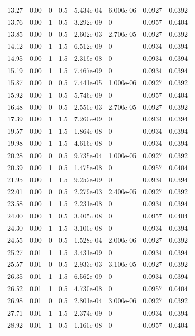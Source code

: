 \documentclass[preview]{standalone}
\begin{document}
{{\begin{tabular}{L{1.2cm}C{1.2cm} C{0.3cm}C{0.5cm} C{1.4cm}C{1.4cm} C{1.4cm}C{1.4cm}}
  13.27  &  0.00  & 0     & 0.5 &  5.434e-04  & 6.000e-06  & 0.0927 &  0.0392   \\ 
  13.76  &  0.00  & 1     & 0.5 &  3.292e-09  & 0  & 0.0957 &  0.0404   \\ 
  13.85  &  0.00  & 0     & 0.5 &  2.602e-03  & 2.700e-05  & 0.0927 &  0.0392   \\ 
  14.12  &  0.00  & 1     & 1.5 &  6.512e-09  & 0  & 0.0934 &  0.0394   \\ 
  14.95  &  0.00  & 1     & 1.5 &  2.319e-08  & 0  & 0.0934 &  0.0394   \\ 
  15.19  &  0.00  & 1     & 1.5 &  7.467e-09  & 0  & 0.0934 &  0.0394   \\ 
  15.87  &  0.00  & 0     & 0.5 &  7.441e-05  & 1.000e-06  & 0.0927 &  0.0392   \\ 
  15.92  &  0.00  & 1     & 0.5 &  5.746e-09  & 0  & 0.0957 &  0.0404   \\ 
  16.48  &  0.00  & 0     & 0.5 &  2.550e-03  & 2.700e-05  & 0.0927 &  0.0392   \\ 
  17.39  &  0.00  & 1     & 1.5 &  7.260e-09  & 0  & 0.0934 &  0.0394   \\ 
  19.57  &  0.00  & 1     & 1.5 &  1.864e-08  & 0  & 0.0934 &  0.0394   \\ 
  19.98  &  0.00  & 1     & 1.5 &  4.616e-08  & 0  & 0.0934 &  0.0394   \\ 
  20.28  &  0.00  & 0     & 0.5 &  9.735e-04  & 1.000e-05  & 0.0927 &  0.0392   \\ 
  20.39  &  0.00  & 1     & 0.5 &  1.475e-08  & 0  & 0.0957 &  0.0404   \\ 
  21.95  &  0.00  & 1     & 1.5 &  9.252e-09  & 0  & 0.0934 &  0.0394   \\ 
  22.01  &  0.00  & 0     & 0.5 &  2.279e-03  & 2.400e-05  & 0.0927 &  0.0392   \\ 
  23.58  &  0.00  & 1     & 1.5 &  2.231e-08  & 0  & 0.0934 &  0.0394   \\ 
  24.00  &  0.00  & 1     & 0.5 &  3.405e-08  & 0  & 0.0957 &  0.0404   \\ 
  24.30  &  0.00  & 1     & 1.5 &  3.100e-08  & 0  & 0.0934 &  0.0394   \\ 
  24.55  &  0.00  & 0     & 0.5 &  1.528e-04  & 2.000e-06  & 0.0927 &  0.0392   \\ 
  25.27  &  0.01  & 1     & 1.5 &  3.431e-09  & 0  & 0.0934 &  0.0394   \\ 
  25.57  &  0.01  & 0     & 0.5 &  2.933e-03  & 3.100e-05  & 0.0927 &  0.0392   \\ 
  26.35  &  0.01  & 1     & 1.5 &  6.562e-09  & 0  & 0.0934 &  0.0394   \\ 
  26.52  &  0.01  & 1     & 0.5 &  4.730e-08  & 0  & 0.0957 &  0.0404   \\ 
  26.98  &  0.01  & 0     & 0.5 &  2.801e-04  & 3.000e-06  & 0.0927 &  0.0392   \\ 
  27.71  &  0.01  & 1     & 1.5 &  2.374e-09  & 0  & 0.0934 &  0.0394   \\ 
  28.92  &  0.01  & 1     & 0.5 &  1.160e-08  & 0  & 0.0957 &  0.0404   \\ 
\hline 
\end{tabular} 

}}
\end{document}
